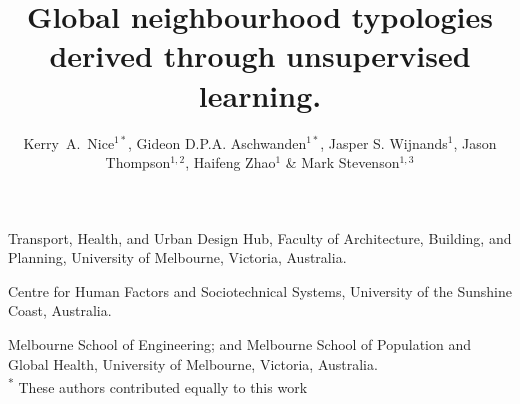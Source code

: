 \documentclass{nature}
\title{Global neighbourhood typologies derived through unsupervised learning.}
\author{Kerry~A.~Nice$^{1*}$,
Gideon D.P.A. Aschwanden$^{1*}$,
Jasper S. Wijnands$^{1}$,
Jason Thompson$^{1,2}$,
Haifeng Zhao$^{1}$ \&
Mark Stevenson$^{1,3}$
}
\begin{document}
\maketitle

\begin{affiliations}
 \item Transport, Health, and Urban Design Hub, Faculty of Architecture, Building, and Planning, University of Melbourne, Victoria, Australia.
 \item Centre for Human Factors and Sociotechnical Systems, University of the Sunshine Coast, Australia.
 \item Melbourne School of Engineering; and Melbourne School of Population and Global Health, University of Melbourne, Victoria, Australia.
 \\ \textsuperscript{*} These authors contributed equally to this work
\end{affiliations}
\end{document}
